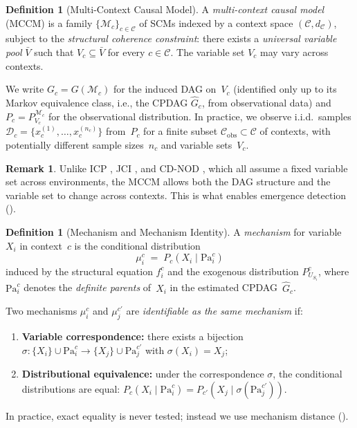 \documentclass[11pt,a4paper]{article}
\theoremstyle{definition}
\newtheorem{definition}[theorem]{Definition}
\newtheorem{remark}[theorem]{Remark}
\newcommand{\cC}{\mathcal{C}}                 %
\newcommand{\cM}{\mathcal{M}}                 %
\newcommand{\cD}{\mathcal{D}}                 %
\newcommand{\Vbar}{\bar{V}}                   %
\newcommand{\Pa}{\mathrm{Pa}}                 %
\newcommand{\dC}{d_{\cC}}                     %
\newcommand{\Cobs}{\cC_{\mathrm{obs}}}        %
\begin{document}
\begin{definition}[Multi-Context Causal Model]\label{def:mccm}
A \emph{multi-context causal model} (MCCM) is a family
$\{\cM_c\}_{c \in \cC}$ of SCMs indexed by a context space $(\cC, \dC)$,
subject to the \emph{structural coherence constraint}: there exists a
\emph{universal variable pool} $\Vbar$ such that $V_c \subseteq \Vbar$ for
every $c \in \cC$.  The variable set $V_c$ may vary across contexts.

We write $G_c = G(\cM_c)$ for the induced DAG on~$V_c$ (identified only
up to its Markov equivalence class, i.e., the CPDAG $\hat{G}_c$, from
observational data) and $P_c = P_{V_c}^{\cM_c}$ for the observational
distribution.  In practice, we observe i.i.d.\ samples
$\cD_c = \{x_c^{(1)}, \ldots, x_c^{(n_c)}\}$ from~$P_c$ for a finite
subset $\Cobs \subset \cC$ of contexts, with potentially different sample
sizes~$n_c$ and variable sets~$V_c$.
\end{definition}

\begin{remark}
Unlike ICP \citep{peters2016causal}, JCI \citep{mooij2020joint}, and
CD-NOD \citep{huang2020causal}, which all assume a fixed variable set
across environments, the MCCM allows both the DAG structure and the
variable set to change across contexts.  This is what enables emergence
detection ().
\end{remark}

\begin{definition}[Mechanism and Mechanism Identity]\label{def:mechanism}
A \emph{mechanism} for variable $X_i$ in context~$c$ is the conditional
distribution
\[
  \mu_i^c \;=\; P_c(X_i \mid \Pa_i^c)
\]
induced by the structural equation $f_i^c$ and the exogenous distribution
$P_{U_{S_i}}^c$, where $\Pa_i^c$ denotes the \emph{definite parents}
of~$X_i$ in the estimated CPDAG~$\hat{G}_c$.

Two mechanisms $\mu_i^c$ and $\mu_j^{c'}$ are \emph{identifiable as the
same mechanism} if:
\begin{enumerate}[nosep,label=(\arabic*)]
  \item \textbf{Variable correspondence:} there exists a bijection
        $\sigma \colon \{X_i\} \cup \Pa_i^c \to \{X_j\} \cup \Pa_j^{c'}$
        with $\sigma(X_i) = X_j$;
  \item \textbf{Distributional equivalence:} under the correspondence
        $\sigma$, the conditional distributions are equal:
        $P_c(X_i \mid \Pa_i^c)
         = P_{c'}(X_j \mid \sigma(\Pa_j^{c'}))$.
\end{enumerate}
In practice, exact equality is never tested; instead we use mechanism
distance ().
\end{definition}
\end{document}
